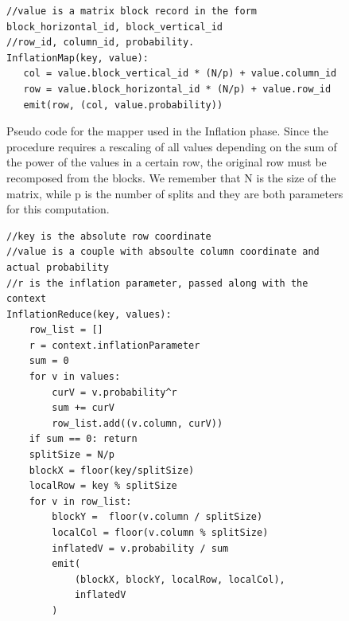 \begin{figure}[H]
\begin{verbatim}
//value is a matrix block record in the form block_horizontal_id, block_vertical_id
//row_id, column_id, probability.
InflationMap(key, value):
   col = value.block_vertical_id * (N/p) + value.column_id
   row = value.block_horizontal_id * (N/p) + value.row_id
   emit(row, (col, value.probability))
\end{verbatim}
\caption{Pseudo code for the mapper used in the Inflation phase. Since the procedure requires a rescaling of all values depending
on the sum of the power of the values in a certain row, the original row must be recomposed from the blocks. 
We remember that N is the size of the matrix, while p is the number of splits and they are both parameters for this computation.}
\label{fig:inflationMap}
\end{figure}

\begin{figure}[H]
\begin{verbatim}
//key is the absolute row coordinate
//value is a couple with absoulte column coordinate and actual probability
//r is the inflation parameter, passed along with the context
InflationReduce(key, values):
    row_list = []
    r = context.inflationParameter
    sum = 0
    for v in values:
        curV = v.probability^r
        sum += curV
        row_list.add((v.column, curV))
    if sum == 0: return
    splitSize = N/p
    blockX = floor(key/splitSize)
    localRow = key % splitSize
    for v in row_list:
        blockY =  floor(v.column / splitSize)
        localCol = floor(v.column % splitSize)
        inflatedV = v.probability / sum
        emit(
            (blockX, blockY, localRow, localCol),
            inflatedV
        )
\end{verbatim}
\caption{}
\label{fig:inflationReduce}
\end{figure}

